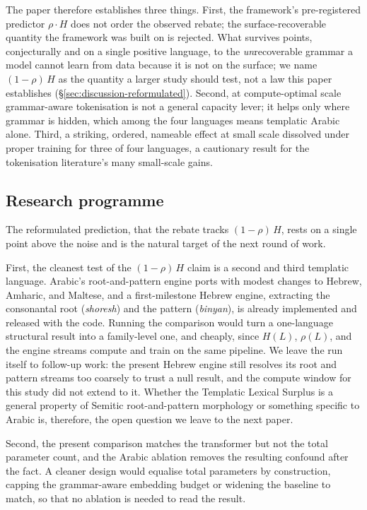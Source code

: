 The paper therefore establishes three things. First, the framework's pre-registered predictor $\rho \cdot H$ does not order the observed rebate; the surface-recoverable quantity the framework was built on is rejected. What survives points, conjecturally and on a single positive language, to the \emph{un}recoverable grammar a model cannot learn from data because it is not on the surface; we name $(1-\rho)\,H$ as the quantity a larger study should test, not a law this paper establishes (\S\ref{sec:discussion-reformulated}). Second, at compute-optimal scale grammar-aware tokenisation is not a general capacity lever; it helps only where grammar is hidden, which among the four languages means templatic Arabic alone. Third, a striking, ordered, nameable effect at small scale dissolved under proper training for three of four languages, a cautionary result for the tokenisation literature's many small-scale gains.

\subsection{Research programme}
\label{sec:conclusion-programme}

The reformulated prediction, that the rebate tracks $(1-\rho)\,H$, rests on a single point above the noise and is the natural target of the next round of work.

First, the cleanest test of the $(1-\rho)\,H$ claim is a second and third templatic language. Arabic's root-and-pattern engine ports with modest changes to Hebrew, Amharic, and Maltese, and a first-milestone Hebrew engine, extracting the consonantal root (\emph{shoresh}) and the pattern (\emph{binyan}), is already implemented and released with the code. Running the comparison would turn a one-language structural result into a family-level one, and cheaply, since $H(L)$, $\rho(L)$, and the engine streams compute and train on the same pipeline. We leave the run itself to follow-up work: the present Hebrew engine still resolves its root and pattern streams too coarsely to trust a null result, and the compute window for this study did not extend to it. Whether the Templatic Lexical Surplus is a general property of Semitic root-and-pattern morphology or something specific to Arabic is, therefore, the open question we leave to the next paper.

Second, the present comparison matches the transformer but not the total parameter count, and the Arabic ablation removes the resulting confound after the fact. A cleaner design would equalise total parameters by construction, capping the grammar-aware embedding budget or widening the baseline to match, so that no ablation is needed to read the result.

